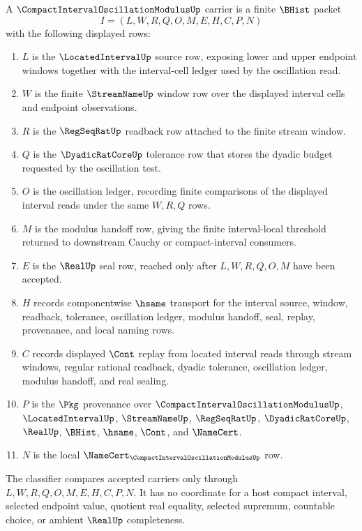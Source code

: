\begin{definition}
\label{def:compact-interval-oscillation-modulus-carrier}
A $\CompactIntervalOscillationModulusUp$ carrier is a finite $\BHist$ packet
$$
I=(L,W,R,Q,O,M,E,H,C,P,N)
$$
with the following displayed rows:
\begin{enumerate}
\item $L$ is the $\LocatedIntervalUp$ source row, exposing lower and upper endpoint windows together with the interval-cell ledger used by the oscillation read.
\item $W$ is the finite $\StreamNameUp$ window row over the displayed interval cells and endpoint observations.
\item $R$ is the $\RegSeqRatUp$ readback row attached to the finite stream window.
\item $Q$ is the $\DyadicRatCoreUp$ tolerance row that stores the dyadic budget requested by the oscillation test.
\item $O$ is the oscillation ledger, recording finite comparisons of the displayed interval reads under the same $W,R,Q$ rows.
\item $M$ is the modulus handoff row, giving the finite interval-local threshold returned to downstream Cauchy or compact-interval consumers.
\item $E$ is the $\RealUp$ seal row, reached only after $L,W,R,Q,O,M$ have been accepted.
\item $H$ records componentwise $\hsame$ transport for the interval source, window, readback, tolerance, oscillation ledger, modulus handoff, seal, replay, provenance, and local naming rows.
\item $C$ records displayed $\Cont$ replay from located interval reads through stream windows, regular rational readback, dyadic tolerance, oscillation ledger, modulus handoff, and real sealing.
\item $P$ is the $\Pkg$ provenance over $\CompactIntervalOscillationModulusUp$, $\LocatedIntervalUp$, $\StreamNameUp$, $\RegSeqRatUp$, $\DyadicRatCoreUp$, $\RealUp$, $\BHist$, $\hsame$, $\Cont$, and $\NameCert$.
\item $N$ is the local $\NameCert_{\CompactIntervalOscillationModulusUp}$ row.
\end{enumerate}
The classifier compares accepted carriers only through $L,W,R,Q,O,M,E,H,C,P,N$. It has no coordinate for a host compact interval, selected endpoint value, quotient real equality, selected supremum, countable choice, or ambient $\RealUp$ completeness.
\end{definition}

